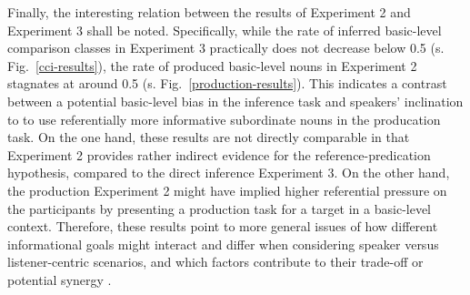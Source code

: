 Finally, the interesting relation between the results of Experiment 2 and Experiment 3 shall be noted. Specifically, while the rate of inferred basic-level comparison classes in Experiment 3 practically does not decrease below 0.5 (s. Fig.~\ref{cci-results}), the rate of produced basic-level nouns in Experiment 2 stagnates at around 0.5 (s. Fig.~\ref{production-results}). This indicates a contrast between a potential basic-level bias in the inference task and speakers' inclination to to use referentially more informative subordinate nouns in the producation task. On the one hand, these results are not directly comparable in that Experiment 2 provides rather indirect evidence for the reference-predication hypothesis, compared to the direct inference Experiment 3. On the other hand, the production Experiment 2 might have implied higher referential pressure on the participants by presenting a production task for a target in a basic-level context. Therefore, these results point to more general issues of how different informational goals might interact and differ when considering speaker versus listener-centric scenarios, and which factors contribute to their trade-off or potential synergy \parencite[cf.][]{heller2008}.  
